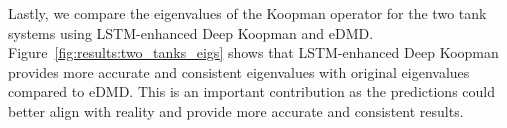 \documentclass[conference]{IEEEtran}
\begin{document}

Lastly, we compare the eigenvalues of the Koopman operator for the two tank systems using LSTM-enhanced Deep Koopman and eDMD\@. Figure~\ref{fig:results:two_tanks_eigs} shows that LSTM-enhanced Deep Koopman provides more accurate and consistent eigenvalues with original eigenvalues compared to eDMD. This is an important contribution as the predictions could better align with reality and provide more accurate and consistent results.
\end{document}
